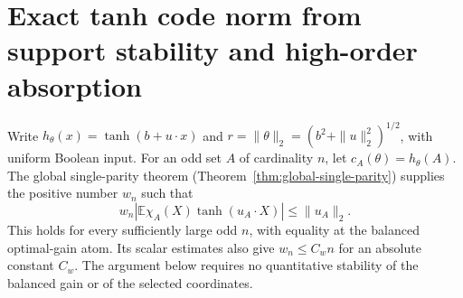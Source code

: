 
\section{Exact tanh code norm from support stability and high-order absorption}

Write $h_\theta(x)=\tanh(b+u\cdot x)$ and
$r=\|\theta\|_2=(b^2+\|u\|_2^2)^{1/2}$, with uniform Boolean input.
For an odd set $A$ of cardinality $n$, let $c_A(\theta)=\widehat h_\theta(A)$.
The global single-parity theorem (Theorem~\ref{thm:global-single-parity}) supplies the positive number $w_n$ such that
\begin{equation}\label{eq:absorb-intrinsic}
 w_n\left|\mathbb E\chi_A(X)\tanh(u_A\cdot X)\right|
 \leq \|u_A\|_2.
\end{equation}
This holds for every sufficiently large odd $n$, with equality at the balanced
optimal-gain atom.  Its scalar estimates also give $w_n\leq C_w n$ for an
absolute constant $C_w$.  The argument below requires no quantitative
stability of the balanced gain or of the selected coordinates.

